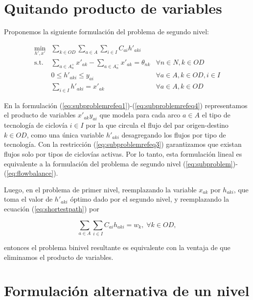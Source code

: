 \section{Quitando producto de variables}
\label{sect:variableproductremoval}

Proponemos la siguiente formulación del problema de segundo nivel:

\begin{align}
  \min_{h',x'} & \sum_{k \in OD} \sum_{a \in A} \sum_{i \in I} C_{ai} h'_{aki}         & \label{eq:subproblemrefeq1} \\
  \text{s.t.}  & \sum_{a \in A_n^+} x'_{ak} - \sum_{a \in A_n^-} x'_{ak} = \theta_{nk} & \forall n \in N, k \in OD \\
               & 0 \leq h'_{aki} \leq y_{ai}                                          & \forall a \in A, k \in OD, i \in I \label{eq:subproblemrefeq3} \\
               & \sum_{i \in I} h'_{aki} = x'_{ak}                                     & \forall a \in A, k \in OD \label{eq:subproblemrefeq4}
\end{align}

En la formulación (\ref{eq:subproblemrefeq1})-(\ref{eq:subproblemrefeq4}) representamos el producto de variables $x'_{ak} y_{ai}$ que modela para cada arco $a \in A$ el tipo de tecnología de ciclovía $i \in I$ por la que circula el flujo del par origen-destino $k \in OD$, como una única variable $h'_{aki}$ desagregando los flujos por tipo de tecnología. Con la restricción (\ref{eq:subproblemrefeq3}) garantizamos que existan flujos solo por tipos de ciclovías activas. Por lo tanto, esta formulación lineal es equivalente a la formulación del problema de segundo nivel (\ref{eq:subproblem})-(\ref{eq:flowbalance}).

Luego, en el problema de primer nivel, reemplazando la variable $x_{ak}$ por $h_{aki}$, que toma el valor de $h'_{aki}$ óptimo dado por el segundo nivel, y reemplazando la ecuación (\ref{eq:shortestpath}) por

\begin{equation*}
  \sum_{a \in A} \sum_{i \in I} C_{ai} h_{aki} = w_k,\; \forall k \in OD,
\end{equation*}

 entonces el problema binivel resultante es equivalente con la ventaja de que eliminamos el producto de variables.

\section{Formulación alternativa de un nivel}
\label{sect:singlelevelformulation}

